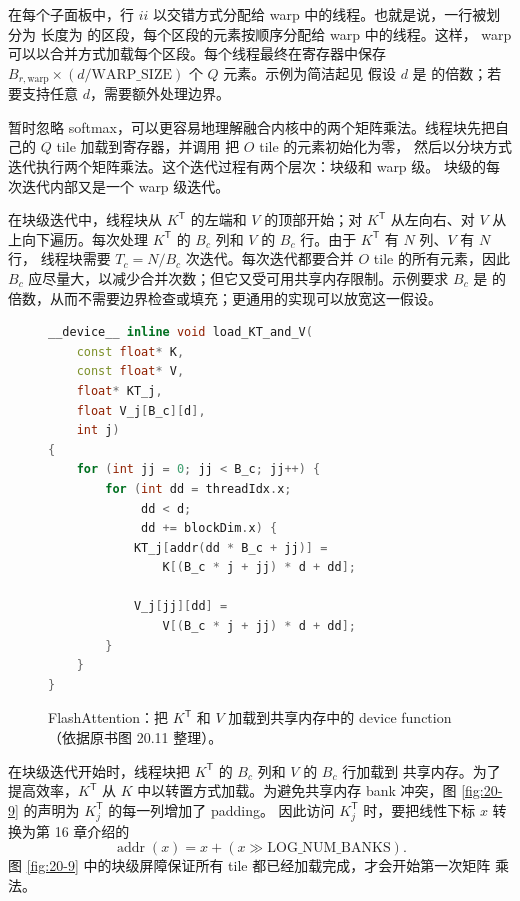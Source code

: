 在每个子面板中，行 $ii$ 以交错方式分配给 warp 中的线程。也就是说，一行被划分为
长度为  的区段，每个区段的元素按顺序分配给 warp 中的线程。这样，
warp 可以以合并方式加载每个区段。每个线程最终在寄存器中保存
$B_{r,\mathrm{warp}}\times(d/\mathrm{WARP\_SIZE})$ 个 $Q$ 元素。示例为简洁起见
假设 $d$ 是  的倍数；若要支持任意 $d$，需要额外处理边界。

暂时忽略 softmax，可以更容易地理解融合内核中的两个矩阵乘法。线程块先把自己的
$Q$ tile 加载到寄存器，并调用  把 $O$ tile 的元素初始化为零，
然后以分块方式迭代执行两个矩阵乘法。这个迭代过程有两个层次：块级和 warp 级。
块级的每次迭代内部又是一个 warp 级迭代。

在块级迭代中，线程块从 $K^{\mathsf T}$ 的左端和 $V$ 的顶部开始；对
$K^{\mathsf T}$ 从左向右、对 $V$ 从上向下遍历。每次处理 $K^{\mathsf T}$ 的
$B_c$ 列和 $V$ 的 $B_c$ 行。由于 $K^{\mathsf T}$ 有 $N$ 列、$V$ 有 $N$ 行，
线程块需要 $T_c=N/B_c$ 次迭代。每次迭代都要合并 $O$ tile 的所有元素，因此
$B_c$ 应尽量大，以减少合并次数；但它又受可用共享内存限制。示例要求 $B_c$ 是
 的倍数，从而不需要边界检查或填充；更通用的实现可以放宽这一假设。

\begin{figure}[htbp]
  \centering
  \begin{lstlisting}[language=C++,basicstyle=\ttfamily\scriptsize]
__device__ inline void load_KT_and_V(
    const float* K,
    const float* V,
    float* KT_j,
    float V_j[B_c][d],
    int j)
{
    for (int jj = 0; jj < B_c; jj++) {
        for (int dd = threadIdx.x;
             dd < d;
             dd += blockDim.x) {
            KT_j[addr(dd * B_c + jj)] =
                K[(B_c * j + jj) * d + dd];

            V_j[jj][dd] =
                V[(B_c * j + jj) * d + dd];
        }
    }
}
  \end{lstlisting}
  \caption{FlashAttention：把 $K^{\mathsf T}$ 和 $V$ 加载到共享内存中的 device
  function（依据原书图 20.11 整理）。}
  \label{fig:20-11}
\end{figure}

在块级迭代开始时，线程块把 $K^{\mathsf T}$ 的 $B_c$ 列和 $V$ 的 $B_c$ 行加载到
共享内存。为了提高效率，$K^{\mathsf T}$ 从 $K$ 中以转置方式加载。为避免共享内存
bank 冲突，图 \ref{fig:20-9} 的声明为 $K^{\mathsf T}_j$ 的每一列增加了 padding。
因此访问 $K^{\mathsf T}_j$ 时，要把线性下标 $x$ 转换为第 16 章介绍的
\[
  \operatorname{addr}(x)=x+\left(x\mathbin{\mathord{\gg}}\mathrm{LOG\_NUM\_BANKS}\right).
\]
图 \ref{fig:20-9} 中的块级屏障保证所有 tile 都已经加载完成，才会开始第一次矩阵
乘法。

